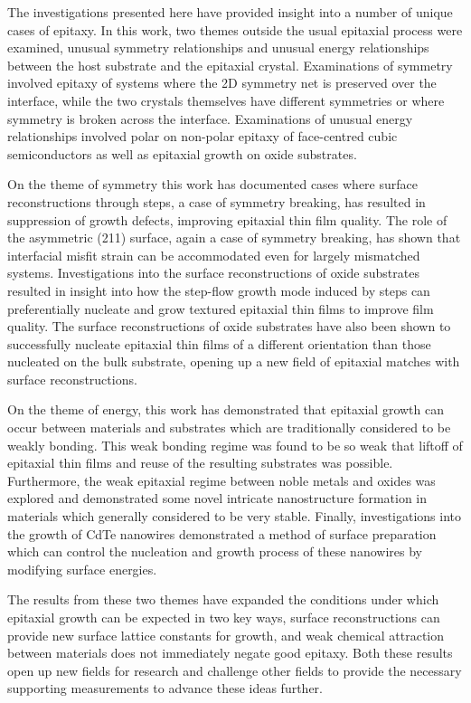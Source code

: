 The investigations presented here have provided insight into a number of unique cases of epitaxy.
In this work, two themes outside the usual epitaxial process were examined, unusual symmetry relationships and unusual energy relationships between the host substrate and the epitaxial crystal.
Examinations of symmetry involved epitaxy of systems where the 2D symmetry net is preserved over the interface, while the two crystals themselves have different symmetries or where symmetry is broken across the interface.
Examinations of unusual energy relationships involved polar on non-polar epitaxy of face-centred cubic semiconductors as well as epitaxial growth on oxide substrates.

On the theme of symmetry this work has documented cases where surface reconstructions through steps, a case of symmetry breaking, has resulted in suppression of growth defects, improving epitaxial thin film quality.
The role of the asymmetric (211) surface, again a case of symmetry breaking, has shown that interfacial misfit strain can be accommodated even for largely mismatched systems.
Investigations into the surface reconstructions of oxide substrates resulted in insight into how the step-flow growth mode induced by steps can preferentially nucleate and grow textured epitaxial thin films to improve film quality.
The surface reconstructions of oxide substrates have also been shown to successfully nucleate epitaxial thin films of a different orientation than those nucleated on the bulk substrate, opening up a new field of epitaxial matches with surface reconstructions.

On the theme of energy, this work has demonstrated that epitaxial growth can occur between materials and substrates which are traditionally considered to be weakly bonding. This weak bonding regime was found to be so weak that liftoff of epitaxial thin films and reuse of the resulting substrates was possible. Furthermore, the weak epitaxial regime between noble metals and oxides was explored and demonstrated some novel intricate nanostructure formation in materials which generally considered to be very stable. Finally, investigations into the growth of CdTe nanowires demonstrated a method of surface preparation which can control the nucleation and growth process of these nanowires by modifying surface energies.

The results from these two themes have expanded the conditions under which epitaxial growth can be expected in two key ways, surface reconstructions can provide new surface lattice constants for growth, and weak chemical attraction between materials does not immediately negate good epitaxy. Both these results open up new fields for research and challenge other fields to provide the necessary supporting measurements to advance these ideas further.